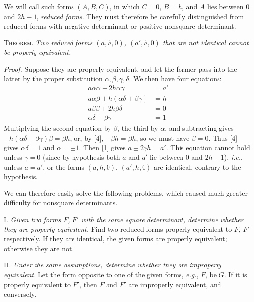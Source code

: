 We will call such forms $(A,B,C)$, in which $C=0$, $B=h$, and $A$ lies between $0$ and $2h-1$, \textit{reduced forms}. They must therefore be carefully distinguished from reduced forms with negative determinant or positive nonsquare determinant.

\textsc{Theorem.} \textit{Two reduced forms $(a,h,0)$, $(a',h,0)$ that are not identical cannot be properly equivalent.}

\textit{Proof.} Suppose they are properly equivalent, and let the former pass into the latter by the proper substitution $\alpha,\beta,\gamma,\delta$. We then have four equations:
\begin{align*}
a\alpha\alpha+2h\alpha\gamma&=a'\tag*{. . . . . . . . . [1]}\\
a\alpha\beta+h(\alpha\delta+\beta\gamma)&=h\tag*{. . . . . . . [2]}\\
a\beta\beta+2h\beta\delta&=0\tag*{. . . . . . . . . . [3]}\\
\alpha\delta-\beta\gamma&=1\tag*{. . . . . . . . . . . [4]}
\end{align*}
Multiplying the second equation by $\beta$, the third by $\alpha$, and subtracting gives $-h(\alpha\delta-\beta\gamma)\beta=\beta h$, or, by [4], $-\beta h=\beta h$, so we must have $\beta=0$. Thus [4] gives $\alpha\delta=1$ and $\alpha=\pm1$. Then [1] gives $a\pm2\gamma h=a'$. This equation cannot hold unless $\gamma=0$ (since by hypothesis both $a$ and $a'$ lie between $0$ and $2h-1$), \textit{i.e.}, unless $a=a'$, or the forms $(a,h,0)$, $(a',h,0)$ are identical, contrary to the hypothesis.

We can therefore easily solve the following problems, which caused much greater difficulty for nonsquare determinants.

I. \textit{Given two forms $F$, $F'$ with the same square determinant, determine whether they are properly equivalent.} Find two reduced forms properly equivalent to $F$, $F'$ respectively. If they are identical, the given forms are properly equivalent; otherwise they are not.

II. \textit{Under the same assumptions, determine whether they are improperly equivalent.} Let the form opposite to one of the given forms, \textit{e.g.}, $F$, be $G$. If it is properly equivalent to $F'$, then $F$ and $F'$ are improperly equivalent, and conversely.
